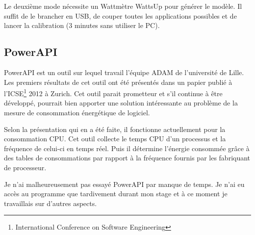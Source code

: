 \documentclass[a4paper, 11pt]{report}
\begin{document}
Le deuxième mode nécessite un Wattmètre WattsUp pour générer le modèle. Il suffit de le brancher en USB, de couper toutes les applications possibles et de lancer la calibration (3 minutes sans utiliser le PC).

\subsection{PowerAPI}
PowerAPI est un outil sur lequel travail l'équipe ADAM de l'université de Lille. Les premiers résultats de cet outil ont été présentés dans un papier\cite{noureddine:hal-00681560} publié à l'ICSE\footnote{International Conference on Software Engineering} 2012 à Zurich. Cet outil parait prometteur et s'il continue à être développé, pourrait bien apporter une solution intéressante au problème de la mesure de consommation énergétique de logiciel.

Selon la présentation qui en a été faite, il fonctionne actuellement pour la consommation CPU. Cet outil collecte le temps CPU d'un processus et la fréquence de celui-ci en temps réel. Puis il détermine l'énergie consommée grâce à des tables de consommations par rapport à la fréquence fournis par les fabriquant de processeur.

Je n'ai malheureusement pas essayé PowerAPI par manque de temps. Je n'ai eu accès au programme que tardivement durant mon stage et à ce moment je travaillais sur d'autres aspects.

\end{document}
